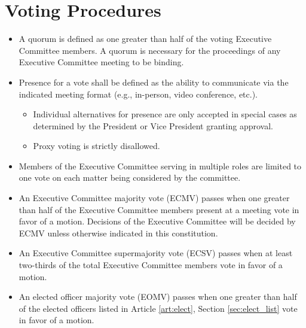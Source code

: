 \documentclass[12pt]{constitution}
\begin{document}
\section{Voting Procedures}
\label{sec:exec_vote}
\begin{itemize}
    \item A quorum is defined as one greater than half of the voting Executive Committee members. A quorum is necessary for the proceedings of any Executive Committee meeting to be binding.
    \item Presence for a vote shall be defined as the ability to communicate via the indicated meeting format (e.g., in-person, video conference, etc.).
    \begin{itemize}
        \item Individual alternatives for presence are only accepted in special cases as determined by the President or Vice President granting approval.
        \item Proxy voting is strictly disallowed.
    \end{itemize}
    \item Members of the Executive Committee serving in multiple roles are limited to one vote on each matter being considered by the committee.
    \item An Executive Committee majority vote (ECMV) passes when one greater than half of the Executive Committee members present at a meeting vote in favor of a motion. Decisions of the Executive Committee will be decided by ECMV unless otherwise indicated in this constitution.
    \item An Executive Committee supermajority vote (ECSV) passes when at least two-thirds of the total Executive Committee members vote in favor of a motion.
    \item An elected officer majority vote (EOMV) passes when one greater than half of the elected officers listed in Article \ref{art:elect}, Section \ref{sec:elect_list} vote in favor of a motion.
\end{itemize}
\end{document}
